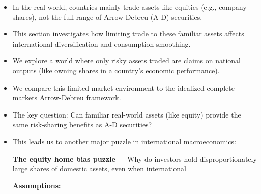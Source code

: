 \documentclass[12pt]{article}
\begin{document}
\begin{itemize}
    \item In the real world, countries mainly trade assets like equities (e.g., company shares), not the full range of Arrow-Debreu (A-D) securities.
    \item This section investigates how limiting trade to these familiar assets affects international diversification and consumption smoothing.
    \item We explore a world where only risky assets traded are claims on national outputs (like owning shares in a country's economic performance).
    \item We compare this limited-market environment to the idealized complete-markets Arrow-Debreu framework.
    \item The key question: Can familiar real-world assets (like equity) provide the same risk-sharing benefits as A-D securities?
    \item This leads us to another major puzzle in international macroeconomics:
    
    \textbf{The equity home bias puzzle} — Why do investors hold disproportionately large shares of domestic assets, even when international

\textbf{Assumptions:}


\end{itemize}
\end{document}
